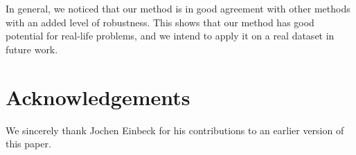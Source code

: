 \documentclass[preprint,12pt]{elsarticle}
\begin{document}
In general, we noticed that our method
is in good agreement with other methods with an added level of robustness.
This shows that our method has good potential for real-life problems,
and we intend to apply it on a real dataset in future work.

\section*{Acknowledgements}

We sincerely thank Jochen Einbeck for his contributions to an earlier version of this paper.

 

\end{document}

